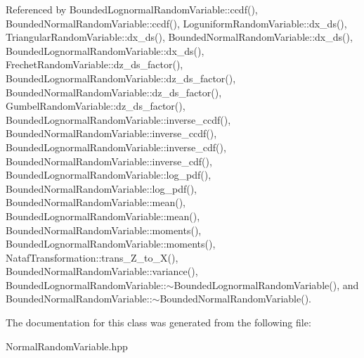 Referenced by Bounded\+Lognormal\+Random\+Variable\+::ccdf(), Bounded\+Normal\+Random\+Variable\+::ccdf(), Loguniform\+Random\+Variable\+::dx\+\_\+ds(), Triangular\+Random\+Variable\+::dx\+\_\+ds(), Bounded\+Normal\+Random\+Variable\+::dx\+\_\+ds(), Bounded\+Lognormal\+Random\+Variable\+::dx\+\_\+ds(), Frechet\+Random\+Variable\+::dz\+\_\+ds\+\_\+factor(), Bounded\+Lognormal\+Random\+Variable\+::dz\+\_\+ds\+\_\+factor(), Bounded\+Normal\+Random\+Variable\+::dz\+\_\+ds\+\_\+factor(), Gumbel\+Random\+Variable\+::dz\+\_\+ds\+\_\+factor(), Bounded\+Lognormal\+Random\+Variable\+::inverse\+\_\+ccdf(), Bounded\+Normal\+Random\+Variable\+::inverse\+\_\+ccdf(), Bounded\+Lognormal\+Random\+Variable\+::inverse\+\_\+cdf(), Bounded\+Normal\+Random\+Variable\+::inverse\+\_\+cdf(), Bounded\+Lognormal\+Random\+Variable\+::log\+\_\+pdf(), Bounded\+Normal\+Random\+Variable\+::log\+\_\+pdf(), Bounded\+Normal\+Random\+Variable\+::mean(), Bounded\+Lognormal\+Random\+Variable\+::mean(), Bounded\+Normal\+Random\+Variable\+::moments(), Bounded\+Lognormal\+Random\+Variable\+::moments(), Nataf\+Transformation\+::trans\+\_\+\+Z\+\_\+to\+\_\+\+X(), Bounded\+Normal\+Random\+Variable\+::variance(), Bounded\+Lognormal\+Random\+Variable\+::$\sim$\+Bounded\+Lognormal\+Random\+Variable(), and Bounded\+Normal\+Random\+Variable\+::$\sim$\+Bounded\+Normal\+Random\+Variable().



The documentation for this class was generated from the following file\+:\begin{DoxyCompactItemize}
\item 
Normal\+Random\+Variable.\+hpp\end{DoxyCompactItemize}
